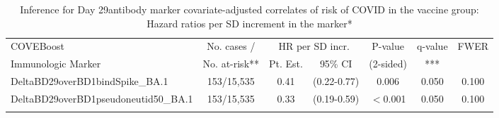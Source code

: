 \begin{longtable}{lcccccc}
\caption{Inference for Day 29antibody marker covariate-adjusted correlates of risk of COVID in the vaccine group: Hazard ratios per SD increment in the marker*} \\ 
   \hline
 
         \multicolumn{1}{l}{COVEBoost} & \multicolumn{1}{c}{No. cases /}   & \multicolumn{2}{c}{HR per SD incr.}                     & \multicolumn{1}{c}{P-value}   & \multicolumn{1}{c}{q-value}   & \multicolumn{1}{c}{FWER} \\ 
         \multicolumn{1}{l}{Immunologic Marker}            & \multicolumn{1}{c}{No. at-risk**} & \multicolumn{1}{c}{Pt. Est.} & \multicolumn{1}{c}{95\% CI} & \multicolumn{1}{c}{(2-sided)} & \multicolumn{1}{c}{***} & \multicolumn{1}{c}{} \\ 
         \hline
 
    DeltaBD29overBD1bindSpike\_BA.1 & 153/15,535 & 0.41 & (0.22-0.77) & 0.006 & 0.050 & 0.100 \\ 
  DeltaBD29overBD1pseudoneutid50\_BA.1 & 153/15,535 & 0.33 & (0.19-0.59) & $<$0.001 & 0.050 & 0.100 \\ 
   \hline
\hline
\label{tab:CoR_univariable_svycoxph_pretty_scaled}
\end{longtable}
